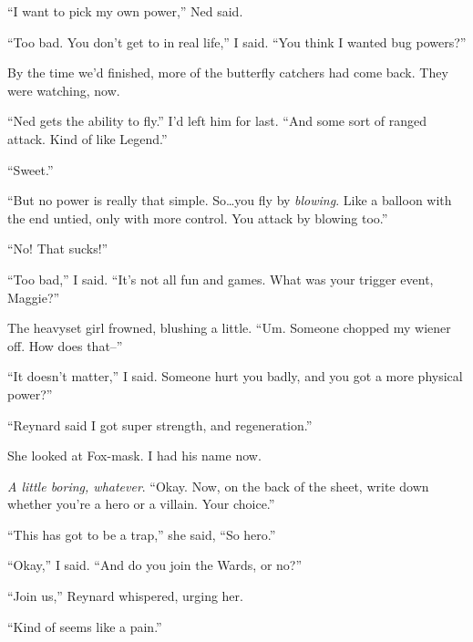 ``I want to pick my own power,'' Ned said.



``Too bad.  You don't get to in real life,'' I said.  ``You think I wanted bug powers?''



By the time we'd finished, more of the butterfly catchers had come back.  They were watching, now.



``Ned gets the ability to fly.''  I'd left him for last. ``And some sort of ranged attack.  Kind of like Legend.''



``Sweet.''



``But no power is really that simple.  So\ldots you fly by \emph{blowing}.  Like a balloon with the end untied, only with more control.  You attack by blowing too.''



``No!  That sucks!''



``Too bad,'' I said.  ``It's not all fun and games.  What was your trigger event, Maggie?''



The heavyset girl frowned, blushing a little.  ``Um.  Someone chopped my wiener off.  How does that--''



``It doesn't matter,'' I said.  Someone hurt you badly, and you got a more physical power?''



``Reynard said I got super strength, and regeneration.''



She looked at Fox-mask.  I had his name now.



\emph{A little boring, whatever}.  ``Okay.  Now, on the back of the sheet, write down whether you're a hero or a villain.  Your choice.''



``This has got to be a trap,'' she said, ``So hero.''



``Okay,'' I said.  ``And do you join the Wards, or no?''



``Join us,'' Reynard whispered, urging her.



``Kind of seems like a pain.''



